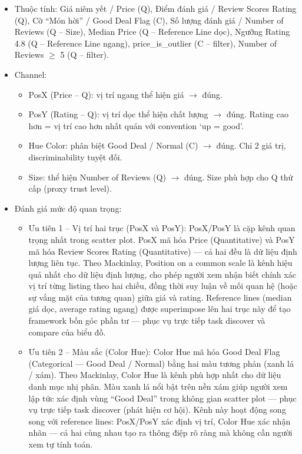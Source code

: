 \begin{itemize}
    \item Thuộc tính: Giá niêm yết / Price (Q), Điểm đánh giá / Review Scores Rating (Q), Cờ ``Món hời'' / Good Deal Flag (C), Số lượng đánh giá / Number of Reviews (Q -- Size), Median Price (Q -- Reference Line dọc), Ngưỡng Rating 4.8 (Q -- Reference Line ngang), price\_is\_outlier (C -- filter), Number of Reviews $\geq$ 5 (Q -- filter).
    \item Channel:
    \begin{itemize}
        \item PosX (Price -- Q): vị trí ngang thể hiện giá $\rightarrow$ đúng.
        \item PosY (Rating -- Q): vị trí dọc thể hiện chất lượng $\rightarrow$ đúng. Rating cao hơn = vị trí cao hơn nhất quán với convention `up = good'.
        \item Hue Color: phân biệt Good Deal / Normal (C) $\rightarrow$ đúng. Chỉ 2 giá trị, discriminability tuyệt đối.
        \item Size: thể hiện Number of Reviews (Q) $\rightarrow$ đúng. Size phù hợp cho Q thứ cấp (proxy trust level).
    \end{itemize}
    \item Đánh giá mức độ quan trọng:
    \begin{itemize}
        \item Ưu tiên 1 -- Vị trí hai trục (PosX và PosY): PosX/PosY là cặp kênh quan trọng nhất trong scatter plot. PosX mã hóa Price (Quantitative) và PosY mã hóa Review Scores Rating (Quantitative) --- cả hai đều là dữ liệu định lượng liên tục. Theo Mackinlay, Position on a common scale là kênh hiệu quả nhất cho dữ liệu định lượng, cho phép người xem nhận biết chính xác vị trí từng listing theo hai chiều, đồng thời suy luận về mối quan hệ (hoặc sự vắng mặt của tương quan) giữa giá và rating. Reference lines (median giá dọc, average rating ngang) được superimpose lên hai trục này để tạo framework bốn góc phần tư --- phục vụ trực tiếp task discover và compare của biểu đồ.
        \item Ưu tiên 2 -- Màu sắc (Color Hue): Color Hue mã hóa Good Deal Flag (Categorical --- Good Deal / Normal) bằng hai màu tương phản (xanh lá / xám). Theo Mackinlay, Color Hue là kênh phù hợp nhất cho dữ liệu danh mục nhị phân. Màu xanh lá nổi bật trên nền xám giúp người xem lập tức xác định vùng ``Good Deal'' trong không gian scatter plot --- phục vụ trực tiếp task discover (phát hiện cơ hội). Kênh này hoạt động song song với reference lines: PosX/PosY xác định vị trí, Color Hue xác nhận nhãn --- cả hai cùng nhau tạo ra thông điệp rõ ràng mà không cần người xem tự tính toán.

\end{itemize}
\end{itemize}
